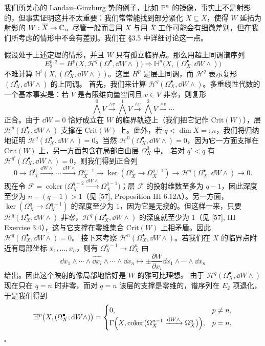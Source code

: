 我们所关心的 Landau–Ginzburg 势的例子，比如 $\mathbb{P}^n$ 的镜像，事实上不是射影的，但事实证明这并不太重要：我们常常能找到部分紧化 $X\subseteq\overline{X}$，使得 $W$ 延拓为射影的 $W:\overline{X}\to\mathbb{C}$。尽管一般而言用 $X$ 与用 $\overline{X}$ 工作可能会有细微差别，但在我们所考虑的情形中不会有差别。我们在 §3.5 中详细讨论这一点。

\begin{example}
假设处于上述定理的情形，并且 $W$ 只有孤立临界点。那么用超上同调谱序列
\[
E_2^{p,q}=H^p\bigl(X,\mathcal{H}^q(\Omega^\bullet,\dd W\wedge)\bigr)\Rightarrow\mathbb{H}^n\bigl(X,(\Omega^\bullet_X,\dd W\wedge)\bigr)
\]
不难计算 $\mathbb{H}^i(X,(\Omega^\bullet_X,\dd W\wedge))$。这里 $H^p$ 是层上同调，而 $\mathcal{H}^q$ 表示复形 $(\Omega^\bullet_X,\dd W\wedge)$ 的上同调。
首先，我们来计算 $\mathcal{H}^q(\Omega^\bullet_X,\dd W\wedge)$。多重线性代数的一个基本事实是：若 $V$ 是有限维向量空间且 $v\in V$ 非零，则复形
\[
\textstyle\bigwedge^0V\xrightarrow{\wedge v}\bigwedge^1V\xrightarrow{\wedge v}\bigwedge^2V\xrightarrow{\wedge v}\cdots
\]
正合。由于 $\dd W=0$ 恰好成立在 $W$ 的临界轨迹上（我们把它记作 $\mathrm{Crit}(W)$），层 $\mathcal{H}^q(\Omega^\bullet_X,\dd W\wedge)$ 支撑在 $\mathrm{Crit}(W)$ 上。此外，若 $q<\dim X=:n$，我们将归纳地证明 $\mathcal{H}^q(\Omega^\bullet_X,\dd W\wedge)=0$。当然 $\mathcal{H}^0(\Omega^\bullet_X,\dd W\wedge)=0$，因为它一方面支撑在 $\mathrm{Crit}(W)$ 上，另一方面包含在局部自由层 $\Omega^0_X$ 中。
若对 $q'<q$ 有 $\mathcal{H}^{q'}(\Omega^\bullet_X,\dd W\wedge)=0$，则我们得到正合列
\[
0\to\Omega^0_X\xrightarrow{\dd W\wedge}\cdots\xrightarrow{\dd W\wedge}\Omega^{q-1}_X\to\ker(\Omega^q_X\to\Omega^{q+1}_X)\to\mathcal{H}^q(\Omega^\bullet_X,\dd W\wedge)\to0.
\]
现在令 $\mathcal{F}=\operatorname{coker}\bigl(\Omega^{q-2}_X\xrightarrow{\dd W\wedge}\Omega^{q-1}_X\bigr)$；层 $\mathcal{F}$ 的投射维数至多为 $q-1$，因此深度至少为 $n-(q-1)>1$（见 [57], Proposition III 6.12A）。另一方面，$\ker(\Omega^q_X\to\Omega^{q+1}_X)$ 的深度至少为 $1$，因为它是无挠的。但这样一来，只要 $\mathcal{H}^q(\Omega^\bullet_X,\dd W\wedge)$ 非零，$\mathcal{H}^q(\Omega^\bullet_X,\dd W\wedge)$ 的深度就至少为 $1$（见 [57], III Exercise 3.4），这与它支撑在零维集合 $\mathrm{Crit}(W)$ 上相矛盾。因此 $\mathcal{H}^q(\Omega^\bullet_X,\dd W\wedge)=0$。
接下来考察 $\mathcal{H}^n(\Omega^\bullet_X,\dd W\wedge)$。若我们在 $X$ 的临界点附近有局部坐标 $x_1,\dots,x_n$，则有 $\Omega^{n-1}_X\to\Omega^n_X$ 由
\[
\dd x_1\wedge\cdots\wedge\widehat{\dd x_i}\wedge\cdots\wedge\dd x_n\longmapsto\pm\frac{\partial W}{\partial x_i}\dd x_1\wedge\cdots\wedge\dd x_n
\]
给出。因此这个映射的像局部地恰好是 $W$ 的雅可比理想。
由于 $\mathcal{H}^q(\Omega^\bullet_X,\dd W\wedge)$ 现在只在 $q=n$ 时非零，而对 $q=n$ 该层的支撑是零维的，谱序列在 $E_2$ 项退化，于是我们得到
\[
\mathbb{H}^p\bigl(X,(\Omega^\bullet_X,\mathrm{d} W\wedge)\bigr)=
\begin{cases}
0,&p\neq n,\\[2pt]
\Gamma\Bigl(X,\operatorname{coker}\bigl(\Omega^{n-1}_X\xrightarrow{\mathrm{d} W\wedge}\Omega^n_X\bigr)\Bigr),&p=n.
\end{cases}
\]
\hfill$\square$
\end{example}

